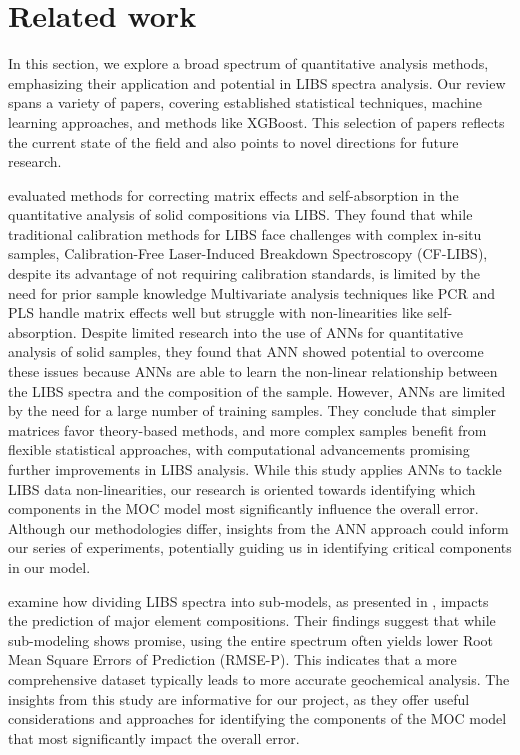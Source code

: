 \section{Related work}\label{sec:related_works}
In this section, we explore a broad spectrum of quantitative analysis methods, emphasizing their application and potential in LIBS spectra analysis. Our review spans a variety of papers, covering established statistical techniques, machine learning approaches, and methods like XGBoost. This selection of papers reflects the current state of the field and also points to novel directions for future research.

\citeauthor{takahashi_quantitative_2017} evaluated methods for correcting matrix effects and self-absorption in the quantitative analysis of solid compositions via LIBS.
They found that while traditional calibration methods for LIBS face challenges with complex in-situ samples, Calibration-Free Laser-Induced Breakdown Spectroscopy (CF-LIBS), despite its advantage of not requiring calibration standards, is limited by the need for prior sample knowledge\cite{hu_review_2022}
Multivariate analysis techniques like PCR and PLS handle matrix effects well but struggle with non-linearities like self-absorption.
Despite limited research into the use of ANNs for quantitative analysis of solid samples, they found that ANN showed potential to overcome these issues because ANNs are able to learn the non-linear relationship between the LIBS spectra and the composition of the sample.
However, ANNs are limited by the need for a large number of training samples.
They conclude that simpler matrices favor theory-based methods, and more complex samples benefit from flexible statistical approaches, with computational advancements promising further improvements in LIBS analysis\cite{takahashi_quantitative_2017}.
While this study applies ANNs to tackle LIBS data non-linearities, our research is oriented towards identifying which components in the MOC model most significantly influence the overall error. Although our methodologies differ, insights from the ANN approach could inform our series of experiments, potentially guiding us in identifying critical components in our model.

\citeauthor{lepore_quantitative_2022} examine how dividing LIBS spectra into sub-models, as presented in \citet{andersonImprovedAccuracyQuantitative2017}, impacts the prediction of major element compositions.
Their findings suggest that while sub-modeling shows promise, using the entire spectrum often yields lower Root Mean Square Errors of Prediction (RMSE-P). 
This indicates that a more comprehensive dataset typically leads to more accurate geochemical analysis\cite{lepore_quantitative_2022}.
The insights from this study are informative for our project, as they offer useful considerations and approaches for identifying the components of the MOC model that most significantly impact the overall error.

